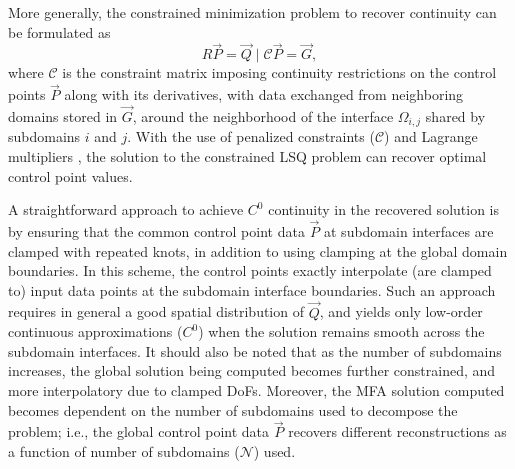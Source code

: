 More generally, the constrained minimization problem to recover continuity \cite{nurbs-book} can be formulated as 
%
\begin{equation}
	R \vec{P} = \vec{Q} \mid \mathcal{C} \vec{P} = \vec{G}, \label{eq:global-constrained-problem}
\end{equation}
%
where $\mathcal{C}$ is the constraint matrix imposing continuity restrictions on the control points $\vec{P}$ along with its derivatives, with data exchanged from neighboring domains stored in $\vec{G}$, around the neighborhood of the interface $\Omega_{i,j}$ shared by subdomains $i$ and $j$.
With the use of penalized constraints ($\mathcal{C}$) and Lagrange multipliers \cite{dornisch2011, paul2020}, the solution to the constrained LSQ problem can recover optimal control point values. 

A straightforward approach to achieve $C^0$ continuity in the recovered solution is by ensuring that the common control point data $\vec{P}$ at subdomain interfaces are clamped with repeated knots, in addition to using clamping at the global domain boundaries. In this scheme, the control points exactly interpolate (are clamped to) input data points at the subdomain interface boundaries. Such an approach requires in general a good spatial distribution of $\vec{Q}$, and yields only low-order continuous approximations ($C^0$) when the solution remains smooth across the subdomain interfaces. It should also be noted that as the number of subdomains increases, the global solution being computed becomes further constrained, and more interpolatory due to clamped DoFs. Moreover, the MFA solution computed becomes dependent on the number of subdomains used to decompose the problem; i.e., the global control point data $\vec{P}$ recovers different reconstructions as a function of number of subdomains ($\mathcal{N}$) used.



